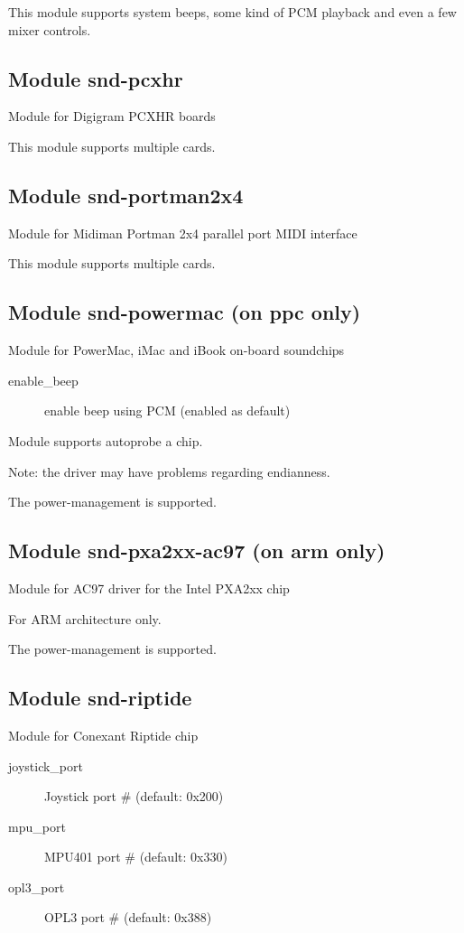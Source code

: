 \documentclass[a4paper,8pt,english]{sphinxmanual}
\begin{document}
This module supports system beeps, some kind of PCM playback and
even a few mixer controls.


\subsection{Module snd-pcxhr}
\label{sound/alsa-configuration:module-snd-pcxhr}
Module for Digigram PCXHR boards

This module supports multiple cards.


\subsection{Module snd-portman2x4}
\label{sound/alsa-configuration:module-snd-portman2x4}
Module for Midiman Portman 2x4 parallel port MIDI interface

This module supports multiple cards.


\subsection{Module snd-powermac (on ppc only)}
\label{sound/alsa-configuration:module-snd-powermac-on-ppc-only}
Module for PowerMac, iMac and iBook on-board soundchips
\begin{description}
\item[{enable\_beep}] \leavevmode
enable beep using PCM (enabled as default)

\end{description}

Module supports autoprobe a chip.

Note: the driver may have problems regarding endianness.

The power-management is supported.


\subsection{Module snd-pxa2xx-ac97 (on arm only)}
\label{sound/alsa-configuration:module-snd-pxa2xx-ac97-on-arm-only}
Module for AC97 driver for the Intel PXA2xx chip

For ARM architecture only.

The power-management is supported.


\subsection{Module snd-riptide}
\label{sound/alsa-configuration:module-snd-riptide}
Module for Conexant Riptide chip
\begin{description}
\item[{joystick\_port}] \leavevmode
Joystick port \# (default: 0x200)

\item[{mpu\_port}] \leavevmode
MPU401 port \# (default: 0x330)

\item[{opl3\_port}] \leavevmode
OPL3 port \# (default: 0x388)

\end{description}
\end{document}
